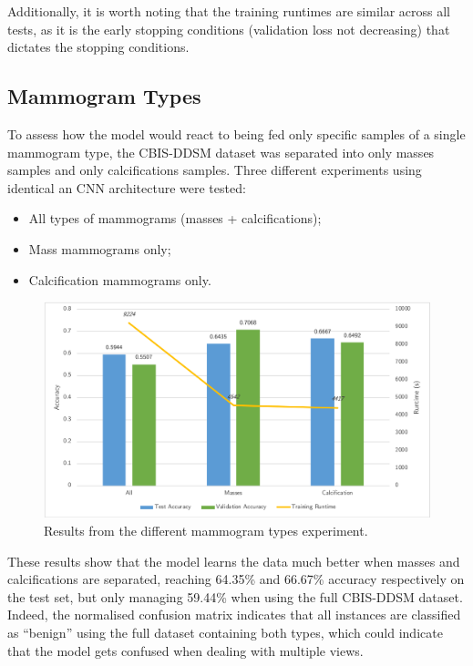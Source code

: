 Additionally, it is worth noting that the training runtimes are similar across all tests, as it is the early stopping conditions (validation loss not decreasing) that dictates the stopping conditions.

\subsection{Mammogram Types}

To assess how the model would react to being fed only specific samples of a single mammogram type, the CBIS-DDSM dataset was separated into only masses samples and only calcifications samples. Three different experiments using identical an CNN architecture were tested:
\begin{itemize}
    \item All types of mammograms (masses + calcifications);
    \item Mass mammograms only;
    \item Calcification mammograms only.
\end{itemize}

\begin{figure}[ht]
\centerline{\includegraphics[width=\textwidth]{figures/evaluation/individual/mammogram_types_results.png}}
\caption{\label{fig:evaluation-individual-mammogram_types_results}Results from the different mammogram types experiment.}
\end{figure}

These results show that the model learns the data much better when masses and calcifications are separated, reaching 64.35\% and 66.67\% accuracy respectively on the test set, but only managing 59.44\% when using the full CBIS-DDSM dataset. Indeed, the normalised confusion matrix indicates that all instances are classified as ``benign'' using the full dataset containing both types, which could indicate that the model gets confused when dealing with multiple views.